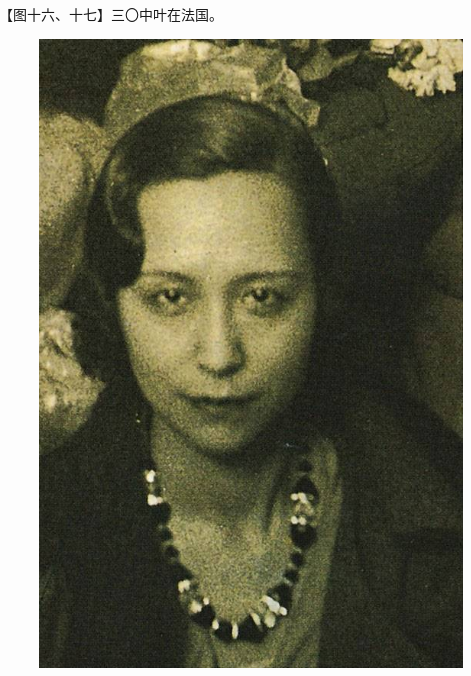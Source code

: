 \clearpage
\par 【图十六、十七】三〇中叶在法国。
\begin{figure}[htb]
    \centering %
    \includegraphics[scale=0.4]{picture/对照记16.jpeg}

\end{figure}
